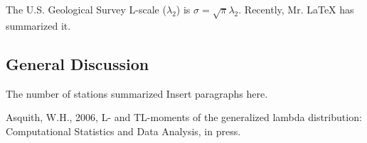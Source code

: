 \documentclass[11pt,twoside,twocolumn]{usgsreport}
\begin{document}
\makefrontcover
\makefrontmatter
\pagestyle{body}
The U.S. Geological Survey
L-scale ($\lambda_2$) is $\sigma = \sqrt{\pi}\lambda_2$.
Recently, Mr. LaTeX has summarized it.
\subsection{General Discussion}
The number of stations summarized 
Insert paragraphs here.
\REFSECTION
\begin{thebibliography}{9}
Asquith, W.H., 2006, L- and TL-moments of the generalized lambda 
distribution: Computational Statistics and Data Analysis, in
press.
\end{thebibliography}
\vspace*{\fill}
\clearpage
\pagestyle{backofreport}
\makebackcover
\end{document}
